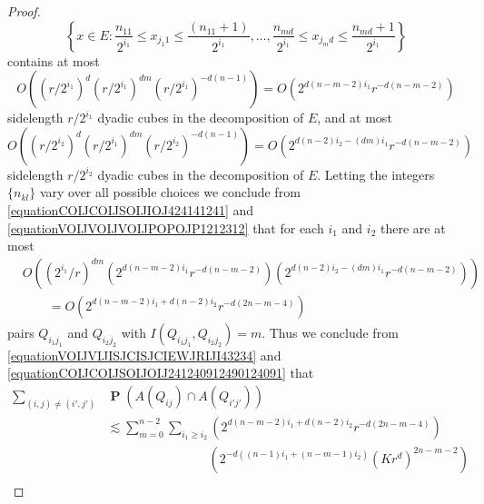 \documentclass[dvipsnames,letterpaper,12pt]{article}
\numberwithin{equation}{section}
\numberwithin{theorem}{section}
\DeclareMathOperator{\PP}{\mathbf{P}}
\begin{document}
\begin{proof}
    \begin{equation}
        \left\{ x \in E : \frac{n_{11}}{2^{i_1}} \leq x_{j_1 1} \leq \frac{(n_{11} + 1)}{2^{i_1}}, \dots, \frac{n_{md}}{2^{i_1}} \leq x_{j_m d} \leq \frac{n_{md} + 1}{2^{i_1}} \right\}
    \end{equation}
    contains at most
    \begin{equation} \label{equationCOIJCOIJSOIJIOJ424141241}
        O \left( (r/2^{i_1})^d (r/2^{i_1})^{dm} (r/2^{i_1})^{-d(n-1)} \right) = O \left( 2^{d(n-m-2)i_1} r^{-d(n-m-2)} \right)
    \end{equation}
    sidelength $r/2^{i_1}$ dyadic cubes in the decomposition of $E$, and at most
    \begin{equation} \label{equationVOIJVOIJVOIJPOPOJP1212312}
        O \left( (r/2^{i_2})^d (r/2^{i_1})^{dm} (r/2^{i_2})^{-d(n-1)} \right) = O \left( 2^{d(n-2) i_2 - (dm) i_1} r^{-d(n-m-2)} \right)
    \end{equation}
    sidelength $r/2^{i_2}$ dyadic cubes in the decomposition of $E$. Letting the integers $\{ n_{kl} \}$ vary over all possible choices we conclude from \eqref{equationCOIJCOIJSOIJIOJ424141241} and \eqref{equationVOIJVOIJVOIJPOPOJP1212312} that for each $i_1$ and $i_2$ there are at most
    \begin{equation} \label{equationCOIJCOIJSOIJOIJ241240912490124091}
    \begin{split}
        &O \left( (2^{i_1}/r)^{dm} \left( 2^{d(n-m-2)i_1} r^{-d(n-m-2)} \right) \left( 2^{d(n-2) i_2 - (dm) i_1} r^{-d(n-m-2)} \right) \right)\\
        &\quad\quad = O \left( 2^{d(n - m - 2)i_1 + d(n-2) i_2} r^{-d(2n - m - 4)} \right)
    \end{split}
    \end{equation}
    pairs $Q_{i_1j_1}$ and $Q_{i_2j_2}$ with $I(Q_{i_1j_1},Q_{i_2j_2}) = m$. Thus we conclude from \eqref{equationVOIJVIJISJCISJCIEWJRIJI43234} and \eqref{equationCOIJCOIJSOIJOIJ241240912490124091} that
    \begin{equation} \label{equationPPOPOKPOPPPPPPDSDSD}
    \begin{split}
        \sum_{(i,j) \neq (i',j')}& \PP(A(Q_{ij}) \cap A(Q_{i'j'}))\\
        &\lesssim \sum_{m = 0}^{n-2} \sum_{i_1 \geq i_2} \left( 2^{d(n-m-2) i_1 + d(n-2) i_2} r^{-d(2n-m-4)} \right)\\
        &\quad\quad\quad\quad\quad\quad\quad\quad\left( 2^{-d((n-1)i_1 + (n-m-1) i_2)} (Kr^d)^{2n - m - 2} \right)\\

\end{split}
\end{equation}
\end{proof}
\end{document}
